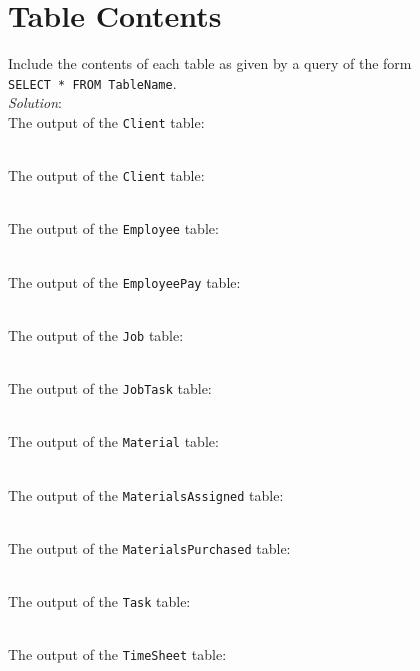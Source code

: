 \documentclass{article}
\begin{document}
\section{Table Contents}
Include the contents of each table as given by a query of the form\hfill\\
\texttt{SELECT * FROM TableName}.\\

\textit{Solution}:\\
The output of the \texttt{Client} table:\hfill\\\\

\newpage
The output of the \texttt{Client} table:\hfill\\\\

\newpage
The output of the \texttt{Employee} table:\hfill\\\\

\newpage
The output of the \texttt{EmployeePay} table:\hfill\\\\

\newpage
The output of the \texttt{Job} table:\hfill\\\\

\newpage
The output of the \texttt{JobTask} table:\hfill\\\\

\newpage
The output of the \texttt{Material} table:\hfill\\\\

\newpage
The output of the \texttt{MaterialsAssigned} table:\hfill\\\\

\newpage
The output of the \texttt{MaterialsPurchased} table:\hfill\\\\

\newpage
The output of the \texttt{Task} table:\hfill\\\\

\newpage
The output of the \texttt{TimeSheet} table:\hfill\\\\
\end{document}
